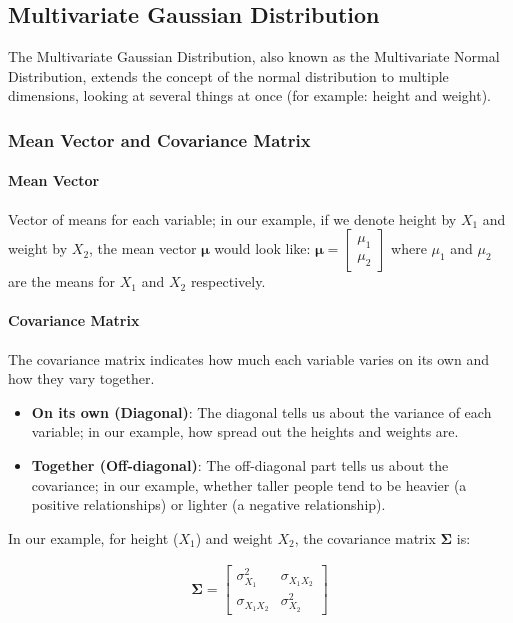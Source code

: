 \documentclass{article}
\begin{document}
\subsection{Multivariate Gaussian Distribution}

The Multivariate Gaussian Distribution, also known as the Multivariate Normal Distribution, extends the concept of the normal distribution to multiple dimensions, looking at several things at once (for example: height and weight).

\subsubsection{Mean Vector and Covariance Matrix}

\paragraph{Mean Vector} Vector of means for each variable; in our example, if we denote height by $X_1$ and weight by $X_2$, the mean vector $\boldsymbol \mu$ would look like: $\boldsymbol \mu = \begin{bmatrix} \mu_1 \\ \mu_2 \end{bmatrix}$ where $\mu_1$ and $\mu_2$ are the means for $X_1$ and $X_2$ respectively.

\paragraph{Covariance Matrix} The covariance matrix indicates how much each variable varies on its own and how they vary together.

\begin{itemize}
    \item \textbf{On its own (Diagonal)}: The diagonal tells us about the variance of each variable; in our example, how spread out the heights and weights are.
    \item \textbf{Together (Off-diagonal)}: The off-diagonal part tells us about the covariance; in our example, whether taller people tend to be heavier (a positive relationships) or lighter (a negative relationship). 
\end{itemize}

In our example, for height ($X_1$) and weight $X_2$, the covariance matrix $\boldsymbol \Sigma$ is: 

\begin{align*}
\boldsymbol{\Sigma} = \begin{bmatrix} {\sigma_{X_1}^2} & {\sigma_{X_1X_2}} \\  {\sigma_{X_1X_2}} & {\sigma_{X_2}^2} \end{bmatrix}
\end{align*}
\end{document}
